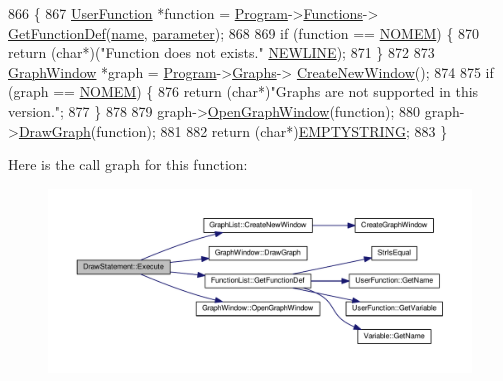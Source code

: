 \begin{DoxyCode}
866 \{
867     \hyperlink{classUserFunction}{UserFunction} *\textcolor{keyword}{function} = \hyperlink{classProgram}{Program}->\hyperlink{classProgram_ac643877adc06800a021263b2234cd236}{Functions}->
      \hyperlink{classFunctionList_acf0716fd18c32a6d52a947052060a2a1}{GetFunctionDef}(\hyperlink{classDrawStatement_a3f94d0d8039a4a683bc0631fc27c6f4c}{name}, \hyperlink{classDrawStatement_a56f4d974e2408e03e1722c319238e7cf}{parameter});
868 
869     \textcolor{keywordflow}{if} (\textcolor{keyword}{function} == \hyperlink{platform_8h_a46ff2bfbf0d44b8466a2251d5bd5e6f8}{NOMEM}) \{
870         \textcolor{keywordflow}{return} (\textcolor{keywordtype}{char}*)(\textcolor{stringliteral}{"Function does not exists."} \hyperlink{platform_8h_a806511f4930171733227c99101dc0606}{NEWLINE});
871     \}
872 
873     \hyperlink{classGraphWindow}{GraphWindow} *graph = \hyperlink{classProgram}{Program}->\hyperlink{classProgram_a9c59323b8c560d2d418a6e6ebcde2e9d}{Graphs}->
      \hyperlink{classGraphList_a184e5ad986cd07281a96dc107ebfcd5d}{CreateNewWindow}();
874 
875     \textcolor{keywordflow}{if} (graph == \hyperlink{platform_8h_a46ff2bfbf0d44b8466a2251d5bd5e6f8}{NOMEM}) \{
876         \textcolor{keywordflow}{return} (\textcolor{keywordtype}{char}*)\textcolor{stringliteral}{"Graphs are not supported in this version."};
877     \}
878 
879     graph->\hyperlink{classGraphWindow_a63309cbe3e1989d9eac566372dc888e8}{OpenGraphWindow}(\textcolor{keyword}{function});
880     graph->\hyperlink{classGraphWindow_a476a4a268feb290df84b6dc4eeac8af2}{DrawGraph}(\textcolor{keyword}{function});
881 
882     \textcolor{keywordflow}{return} (\textcolor{keywordtype}{char}*)\hyperlink{platform_8h_a79ff1b9ff232b38c8b5600659e6bc7c2}{EMPTYSTRING};
883 \}
\end{DoxyCode}


Here is the call graph for this function\+:
\nopagebreak
\begin{figure}[H]
\begin{center}
\leavevmode
\includegraphics[width=350pt]{d3/d82/classDrawStatement_af3be5149199ab9940b43ee5a2360ba80_cgraph}
\end{center}
\end{figure}





